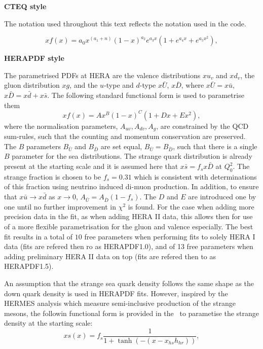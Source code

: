 \begin{description}
\item \bf{CTEQ style}\rm

The notation used throughout this text reflects the 
notation used in the code.

\begin{equation}
 xf(x) = a_0 x^{(a_1+n)} (1-x)^{a_2} e^{a_3x} (1 + e^{a_4 x} + e^{a_5 x^2}),
\label{eqn:pdf_cteq}
\end{equation}
%
\item \bf{HERAPDF style}\rm

 The parametrised PDFs at HERA are the valence distributions
 $xu_v$ and  $xd_v$,  the gluon distribution $xg$, and the $u$-type and $d$-type 
$x\bar{U}$, $x\bar{D}$, where $x\bar{U} = x\bar{u}$, 
$x\bar{D} = x\bar{d} +x\bar{s}$. 
The following standard functional form is used to parametrise them
\begin{equation}
 xf(x) = A x^{B} (1-x)^{C} (1 + D x + E x^2),
\label{eqn:pdf}
\end{equation}
%
where the normalisation parameters, $A_{uv}, A_{dv}, A_g$,  are constrained by  
the QCD sum-rules, such that the counting  and  momentum conservation are preserved.
The $B$ parameters  $B_{\bar{U}}$ and $B_{\bar{D}}$ are set equal,
 $B_{\bar{U}}=B_{\bar{D}}$, such that 
there is a single $B$ parameter for the sea distributions. 
%
The strange quark distribution 
is already present at the starting scale and 
%
it is  assumed here that 
$x\bar{s}= f_s  x\bar{D}$ at $Q^2_0$. 
The  strange fraction is chosen to be $f_s=0.31$ which is
consistent with determinations 
of this fraction using neutrino induced di-muon production. 
%
In addition, to ensure that $x\bar{u} \to x\bar{d}$ 
as $x \to 0$,  
$A_{\bar{U}}=A_{\bar{D}} (1-f_s)$.
%
The $D$ and $E$ are introduced one by one until no further improvement in $\chi^2$ is found.
For the case when adding more precision data in the fit, as when adding HERA II data, this allows then for use of a more flexible parametrisation for the gluon and valence especially.
The best fit  results in a total of $10$ free parameters when performing fits to solely HERA I data (fits are refered then ro as HERAPDF1.0), and of 13 free parameters when adding preliminary HERA II data on top (fits are refered then to as HERAPDF1.5).


An assumption that the strange sea quark density follows the same shape as the down quark density is used in HERAPDF fits. 
 However, inspired by the HERMES analysis \cite{hermes} which measure semi-inclusive production of the strange mesons, the followin functional form is provided in the \fitter\ to parametise the strange density  at the starting scale:
\begin{equation}
xs(x)=f_s\frac{1}{1+\tanh(-(x-x_{hs}h_{hr}))},
\end{equation}


\end{description}
